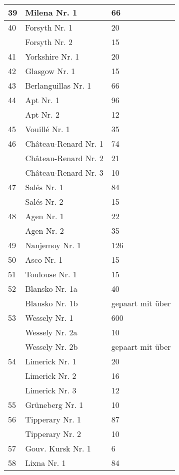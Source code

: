 \documentclass[a4paper, 11pt, oneside, polutonikogreek, german]{article}
\begin{document}
\begin{center}
\begin{longtable}{|l|l|l|}
        39 & Milena Nr. 1 & 66 \\ \hline
        40 & Forsyth Nr. 1 & 20 \\ \hline
          & Forsyth Nr. 2 & 15 \\ \hline
        41 & Yorkshire Nr. 1 & 20 \\ \hline
        42 & Glasgow Nr. 1 & 15 \\ \hline
        43 & Berlanguillas Nr. 1 & 66 \\ \hline
        44 & Apt Nr. 1 & 96 \\ \hline
          & Apt Nr. 2 & 12 \\ \hline
        45 & Vouillé Nr. 1 & 35 \\ \hline
        46 & Château-Renard Nr. 1 & 74 \\ \hline
          & Château-Renard Nr. 2 & 21 \\ \hline
          & Château-Renard Nr. 3 & 10 \\ \hline
        47 & Salés Nr. 1 & 84 \\ \hline
          & Salés Nr. 2 & 15 \\ \hline
        48 & Agen Nr. 1 & 22 \\ \hline
          & Agen Nr. 2 & 35 \\ \hline
        49 & Nanjemoy Nr. 1 & 126 \\ \hline
        50 & Asco Nr. 1 & 15 \\ \hline
        51 & Toulouse Nr. 1 & 15 \\ \hline
        52 & Blansko Nr. 1a & 40 \\ \hline
          & Blansko Nr. 1b & gepaart mit über \\ \hline
        53 & Wessely Nr. 1 & 600 \\ \hline
          & Wessely Nr. 2a & 10 \\ \hline
          & Wessely Nr. 2b & gepaart mit über \\ \hline
        54 & Limerick Nr. 1 & 20 \\ \hline
          & Limerick Nr. 2 & 16 \\ \hline
          & Limerick Nr. 3 & 12 \\ \hline
        55 & Grüneberg Nr. 1 & 10 \\ \hline
        56 & Tipperary Nr. 1 & 87 \\ \hline
          & Tipperary Nr. 2 & 10 \\ \hline
        57 & Gouv. Kursk Nr. 1 & 6 \\ \hline
        58 & Lixna Nr. 1 & 84 \\ \hline

\end{longtable}
\end{center}
\end{document}
